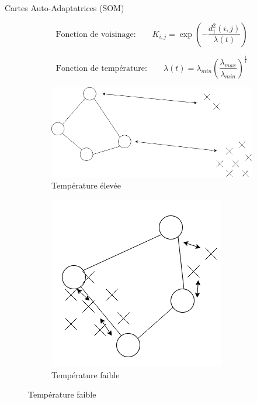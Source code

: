 \documentclass[hyperref={pdfpagelabels=false}]{beamer}
\begin{document}
        \begin{frame}{Cartes Auto-Adaptatrices (SOM)}
            \begin{center}
                
            \end{center}
            
            \begin{equation*}
                \text{Fonction de voisinage:} \qquad K_{i,j} = 
                \exp\left(-\frac{d^2_1(i,j)}{\lambda(t)}\right)
            \end{equation*}

            \begin{equation*}
                \text{Fonction de température:} \qquad
                \lambda(t) = 
                \lambda_{min}\left(\frac{\lambda_{max}}{\lambda_{min}}\right)^{\frac{1}{t}}
            \end{equation*}

            \begin{figure}[b]
                \centering
                \begin{subfigure}[b]{0.45\textwidth}
                    \centering
                    \includegraphics[scale=.20]{somhot}
                    \caption{Température élevée}
                \end{subfigure}
                \begin{subfigure}[b]{0.45\textwidth}
                    \centering
                    \includegraphics[scale=.25]{somcold}
                    \caption{Température faible}
                \end{subfigure}
            \end{figure}
        \end{frame}
\end{document}
